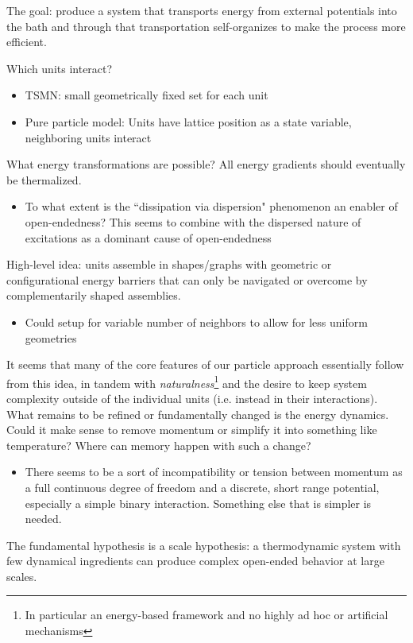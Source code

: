 \documentclass[12pt,letterpaper]{article}
\begin{document}
The goal: produce a system that transports energy from external potentials into the bath and through that transportation self-organizes to make the process more efficient.

Which units interact?
\begin{itemize}
\item TSMN: small geometrically fixed set for each unit
\item Pure particle model: Units have lattice position as a state variable, neighboring units interact
\end{itemize}

What energy transformations are possible? All energy gradients should eventually be thermalized.
\begin{itemize}
\item To what extent is the ``dissipation via dispersion" phenomenon an enabler of open-endedness? This seems to combine with the dispersed nature of excitations as a dominant cause of open-endedness
\end{itemize}
High-level idea: units assemble in shapes/graphs with geometric or configurational energy barriers that can only be navigated or overcome by complementarily shaped assemblies.
\begin{itemize}
\item Could setup for variable number of neighbors to allow for less uniform geometries
\end{itemize}
It seems that many of the core features of our particle approach essentially follow from this idea, in tandem with \textit{naturalness}\footnote{In particular an energy-based framework and no highly ad hoc or artificial mechanisms} and the desire to keep system complexity outside of the individual units (i.e. instead in their interactions). What remains to be refined or fundamentally changed is the energy dynamics. Could it make sense to remove momentum or simplify it into something like temperature? Where can memory happen with such a change?
\begin{itemize}
\item There seems to be a sort of incompatibility or tension between momentum as a full continuous degree of freedom and a discrete, short range potential, especially a simple binary interaction. Something else that is simpler is needed.
\end{itemize}

The fundamental hypothesis is a scale hypothesis: a thermodynamic system with few dynamical ingredients can produce complex open-ended behavior at large scales.
\end{document}
